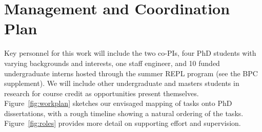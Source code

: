\section*{Management and Coordination Plan }\label{appendix:coord}




Key personnel for this work will include the two co-PIs, four PhD
students with varying backgrounds and interests, one staff engineer,
and 10 funded undergraduate interns hosted through the summer REPL
program (see the BPC supplement). We will include other undergraduate and
masters students in research for course credit as opportunities present themselves.
Figure~\ref{fig:workplan} sketches our envisaged mapping of tasks onto
PhD dissertations, with a rough timeline showing a natural ordering
of the tasks.  Figure~\ref{fig:roles} provides more detail on
supporting effort and supervision.

